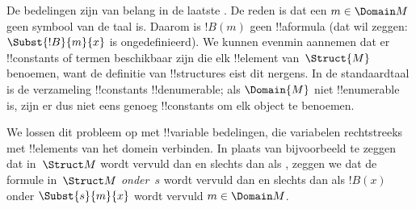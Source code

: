 \documentclass[../../../include/open-logic-section]{subfiles}
\begin{document}
\begin{explain}
De bedelingen zijn van belang in de laatste
. De reden is dat een $m \in
\Domain M$ geen symbool van de taal is. Daarom is $!B(m)$ geen
!!a{formula} (dat wil zeggen: $\Subst{!B}{m}{x}$ is ongedefinieerd). We
kunnen evenmin aannemen dat er !!{constant}s of termen beschikbaar zijn
die elk !!{element} van~$\Struct{M}$ benoemen, want de definitie van
!!{structure}s eist dit nergens. In de standaardtaal is de verzameling
!!{constant}s !!{denumerable}; als $\Domain{M}$ niet !!{enumerable} is,
zijn er dus niet eens genoeg !!{constant}s om elk object te benoemen.

We lossen dit probleem op met !!{variable} bedelingen, die variabelen
rechtstreeks met !!{element}s van het domein verbinden. In plaats van
bijvoorbeeld te zeggen dat
 in~$\Struct M$
wordt vervuld dan en slechts dan als , zeggen we dat de formule in~$\Struct M$
\emph{onder}~$s$ wordt vervuld dan en slechts dan als $!B(x)$ onder
$\Subst{s}{m}{x}$ wordt vervuld  $m \in \Domain M$.
\end{explain}
\end{document}
